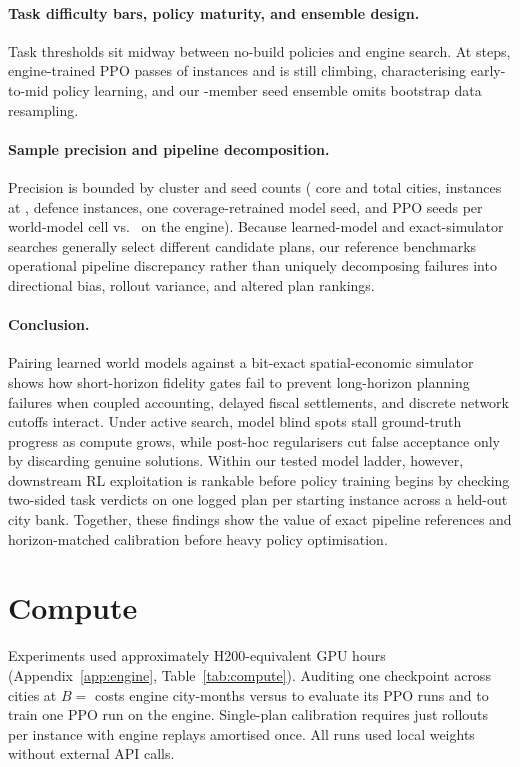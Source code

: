 \paragraph{Task difficulty bars, policy maturity, and ensemble design.}
Task thresholds sit midway between no-build policies and engine search. \ThresholdSentence{} At \RlMonths{} steps, engine-trained PPO passes \RlEngFull{} of instances and is still climbing, characterising early-to-mid policy learning, and our \DefMembers-member seed ensemble omits bootstrap data resampling.

\paragraph{Sample precision and pipeline decomposition.}
Precision is bounded by cluster and seed counts (\HeldOutFamilies{} core and \AllCities{} total cities, \PaInstances{} instances at , \DefInstances{} defence instances, one coverage-retrained model seed, and \CovRlSeeds{} PPO seeds per world-model cell vs.\ \RlEngSeeds{} on the engine). Because learned-model and exact-simulator searches generally select different candidate plans, our reference benchmarks operational pipeline discrepancy rather than uniquely decomposing failures into directional bias, rollout variance, and altered plan rankings.

\paragraph{Conclusion.}\label{sec:conclusion}
Pairing learned world models against a bit-exact spatial-economic simulator shows how short-horizon fidelity gates fail to prevent long-horizon planning failures when coupled accounting, delayed fiscal settlements, and discrete network cutoffs interact. Under active search, model blind spots stall ground-truth progress as compute grows, while post-hoc regularisers cut false acceptance only by discarding genuine solutions. Within our tested model ladder, however, downstream RL exploitation is rankable before policy training begins by checking two-sided task verdicts on one logged plan per starting instance across a held-out city bank. Together, these findings show the value of exact pipeline references and horizon-matched calibration before heavy policy optimisation.

\section*{Compute}\label{sec:compute}

Experiments used approximately \CompEqTotalTen{} H200-equivalent GPU hours (Appendix~\ref{app:engine}, Table~\ref{tab:compute}). Auditing one checkpoint across \AllCities{} cities at $B ={}$ costs \CostAuditThou{} engine city-months versus \CostRlEval{} to evaluate its \RlRunsPerCkpt{} PPO runs and \CostRlTrainRun{} to train one PPO run on the engine.\ifAcETwoAbove\else{} Single-plan calibration requires just \KVerdict{} rollouts per instance with engine replays amortised once.\fi{} All runs used local weights without external API calls.
